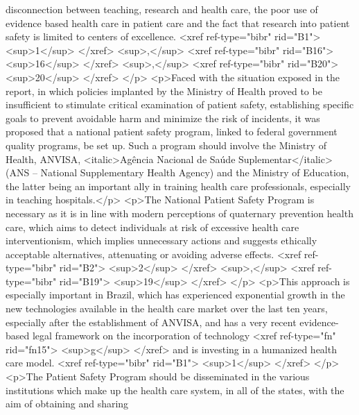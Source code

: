           disconnection between teaching, research and health care, the poor use of evidence based
          health care in patient care and the fact that research into patient safety is limited to
          centers of excellence. <xref ref-type="bibr" rid="B1">
            <sup>1</sup>
          </xref>
          <sup>,</sup>
          <xref ref-type="bibr" rid="B16">
            <sup>16</sup>
          </xref>
          <sup>,</sup>
          <xref ref-type="bibr" rid="B20">
            <sup>20</sup>
          </xref>
        </p>
        <p>Faced with the situation exposed in the report, in which policies implanted by the
          Ministry of Health proved to be insufficient to stimulate critical examination of patient
          safety, establishing specific goals to prevent avoidable harm and minimize the risk of
          incidents, it was proposed that a national patient safety program, linked to federal
          government quality programs, be set up. Such a program should involve the Ministry of
          Health, ANVISA, <italic>Agência Nacional de Saúde Suplementar</italic> (ANS – National
          Supplementary Health Agency) and the Ministry of Education, the latter being an important
          ally in training health care professionals, especially in teaching hospitals.</p>
        <p>The National Patient Safety Program is necessary as it is in line with modern perceptions
          of quaternary prevention health care, which aims to detect individuals at risk of
          excessive health care interventionism, which implies unnecessary actions and suggests
          ethically acceptable alternatives, attenuating or avoiding adverse effects. <xref
            ref-type="bibr" rid="B2">
            <sup>2</sup>
          </xref>
          <sup>,</sup>
          <xref ref-type="bibr" rid="B19">
            <sup>19</sup>
          </xref>
        </p>
        <p>This approach is especially important in Brazil, which has experienced exponential growth
          in the new technologies available in the health care market over the last ten years,
          especially after the establishment of ANVISA, and has a very recent evidence-based legal
          framework on the incorporation of technology <xref ref-type="fn" rid="fn15">
            <sup>g</sup>
          </xref> and is investing in a humanized health care model. <xref ref-type="bibr" rid="B1">
            <sup>1</sup>
          </xref>
        </p>
        <p>The Patient Safety Program should be disseminated in the various institutions which make
          up the health care system, in all of the states, with the aim of obtaining and sharing
